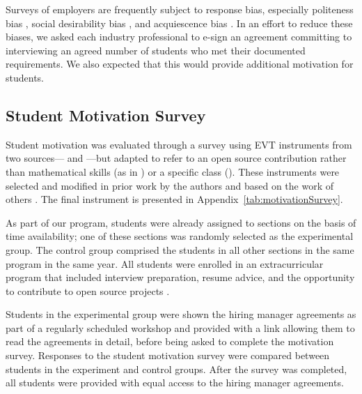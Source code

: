 Surveys of employers are frequently subject to response bias, especially politeness bias \citep{leeBestAnswerReally2019}, social desirability bias \citep{furnhamResponseBiasSocial1986}, and acquiescence bias \citep{knowlesAcquiescentRespondingSelfReports1997}. In an effort to reduce these biases, we asked each industry professional to e-sign an agreement committing to interviewing an agreed number of students who met their documented requirements. We also expected that this would provide additional motivation for students.

\subsection{Student Motivation Survey}

Student motivation was evaluated through a survey using EVT instruments from two sources---\citet{ecclesMindActorStructure1995} and \citet{flakeMeasuringCostForgotten2015}---but adapted to refer to an open source contribution rather than mathematical skills (as in \citet{ecclesMindActorStructure1995}) or a specific class (\citet{flakeMeasuringCostForgotten2015}). These instruments were selected and modified in prior work by the authors and based on the work of others \citep{olewnikCocurricularEngagementEngineering2023}. The final instrument is presented in Appendix~\ref{tab:motivationSurvey}.

As part of our program, students were already assigned to sections on the basis of time availability; one of these sections was randomly selected as the experimental group. The control group comprised the students in all other sections in the same program in the same year. All students were enrolled in an extracurricular program that included interview preparation, resume advice, and the opportunity to contribute to open source projects \citep{narayananScalableApproachSupport2023}.

Students in the experimental group were shown the hiring manager agreements as part of a regularly scheduled workshop and provided with a link allowing them to read the agreements in detail, before being asked to complete the motivation survey. Responses to the student motivation survey were compared between students in the experiment and control groups. After the survey was completed, all students were provided with equal access to the hiring manager agreements.